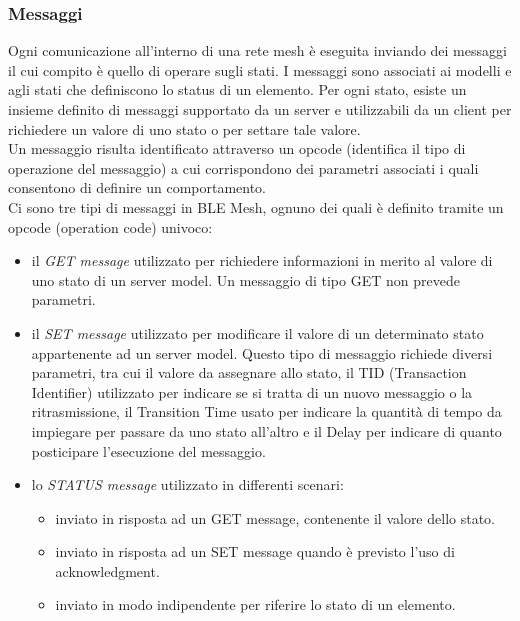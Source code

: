 \subsubsection{Messaggi}
\label{subsub:messaggi}
Ogni comunicazione all'interno di una rete mesh è eseguita inviando dei messaggi il cui compito è quello di operare sugli stati. I messaggi sono associati ai modelli e agli stati che definiscono lo status di un elemento. Per ogni stato, esiste un insieme definito di messaggi supportato da un server e utilizzabili da un client per richiedere un valore di uno stato o per settare tale valore.\\
Un messaggio risulta identificato attraverso un opcode (identifica il tipo di operazione del messaggio) a cui corrispondono dei parametri associati i quali consentono di definire un comportamento.\\
Ci sono tre tipi di messaggi in BLE Mesh, ognuno dei quali è definito tramite un opcode (operation code) univoco:
\begin{itemize}
    \item il \textit{GET message} utilizzato per richiedere informazioni in merito al valore di uno stato di un server model. Un messaggio di tipo GET non prevede parametri.
    
    \item il \textit{SET message} utilizzato per modificare il valore di un determinato stato appartenente ad un server model. Questo tipo di messaggio richiede diversi parametri, tra cui il valore da assegnare allo stato, il TID (Transaction Identifier) utilizzato per indicare se si tratta di un nuovo messaggio o la ritrasmissione, il Transition Time usato per indicare la quantità di tempo da impiegare per passare da uno stato all'altro e il Delay per indicare di quanto posticipare l'esecuzione del messaggio.
    
    \item lo \textit{STATUS message} utilizzato in differenti scenari:
    \begin{itemize}
        \item inviato in risposta ad un GET message, contenente il valore dello stato.
        \item inviato in risposta ad un SET message quando è previsto l'uso di acknowledgment.
        \item inviato in modo indipendente per riferire lo stato di un elemento.
    \end{itemize}
\end{itemize}

